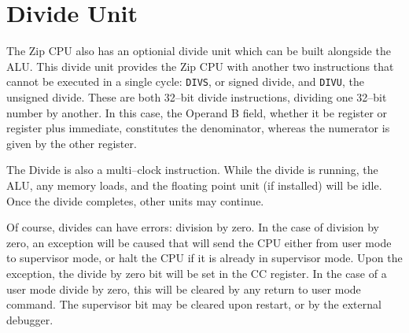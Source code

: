 \documentclass{gqtekspec}
\begin{document}
\section{Divide Unit}
The Zip CPU also has an optionial divide unit which can be built alongside the
ALU.  This divide unit provides the Zip CPU with another two instructions that
cannot be executed in a single cycle: {\tt DIVS}, or signed divide, and
{\tt DIVU}, the unsigned divide.  These are both 32--bit divide instructions,
dividing one 32--bit number by another.  In this case, the Operand B field,
whether it be register or register plus immediate, constitutes the denominator,
whereas the numerator is given by the other register.

The Divide is also a multi--clock instruction.  While the divide is running,
the ALU, any memory loads, and the floating point unit (if installed) will be
idle.  Once the divide completes, other units may continue.

Of course, divides can have errors: division by zero.  In the case of division
by zero, an exception will be caused that will send the CPU either from 
user mode to supervisor mode, or halt the CPU if it is already in supervisor
mode.  Upon the exception, the divide by zero bit will be set in the CC
register.  In the case of a user mode divide by zero, this will be cleared
by any return to user mode command.  The supervisor bit may be cleared upon
restart, or by the external debugger.
\end{document}
